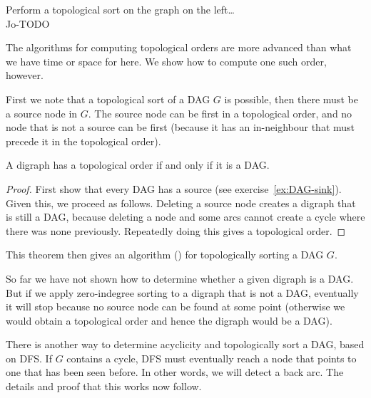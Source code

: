 \begin{Boxample}[1]
Perform a topological sort on the graph on the left\ldots\\ 
Jo-TODO
\end{Boxample}

The algorithms for computing  topological orders are
more advanced than what we have time or space for here. We show how to
compute one such order, however.

First we note that  a topological sort of a DAG $G$
is possible, then there must be a source node in $G$. The source
node can be first in a topological order, and no node that is not
a source can be first (because it has an in-neighbour that must
precede it in the topological order).


\begin{Theorem}
\label{thm:topDAG}
A digraph has a topological order if and only if it is a DAG.
\end{Theorem}

\begin{proof} 
First show that every DAG has a source (see
exercise~\ref{ex:DAG-sink}).  Given this, we proceed as follows. Deleting
a source node creates a digraph that is still a DAG, because deleting
a node and some arcs cannot create a cycle where there was none
previously. Repeatedly doing this gives a topological order.
\end{proof}

This theorem then gives an algorithm ()
for topologically sorting a DAG $G$.

So far we have not shown how to determine whether a given digraph is
a DAG. But if we apply zero-indegree sorting to a digraph that is not
a DAG, eventually it will stop because no source node can be found at
some point (otherwise we would obtain a topological order and hence the
digraph would be a DAG).

There is another way to determine acyclicity and topologically sort a
DAG, based on DFS. If $G$ contains a cycle,  DFS must eventually reach
a node that points to one that has been seen before. In other words, we
will detect a back arc. The details and proof that this works now follow.

